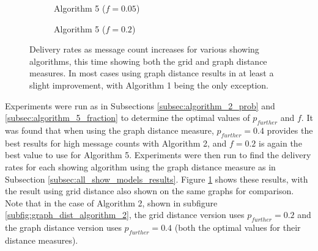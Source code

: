 \documentclass[bsc,frontabs,twoside,singlespacing,parskip,deptreport]{infthesis}     %
\begin{document}
\begin{figure}
\begin{subfigure}[]{0.47\textwidth}
\caption{Algorithm 5 ($f=0.05$)}
\end{subfigure}
%
\par\bigskip 
%
\begin{subfigure}[]{0.47\textwidth}
\caption{Algorithm 5 ($f=0.2$)}
\end{subfigure}
\caption{Delivery rates as message count increases for various showing algorithms, this time showing both the grid and graph distance measures. In most cases using graph distance results in at least a slight improvement, with Algorithm 1 being the only exception.}
\label{fig:graph_dist_show_models}
\end{figure}

Experiments were run as in Subsections \ref{subsec:algorithm_2_prob} and \ref{subsec:algorithm_5_fraction} to determine the optimal values of $p_{further}$ and $f$. It was found that when using the graph distance measure, $p_{further}=0.4$ provides the best results for high message counts with Algorithm 2, and $f=0.2$ is again the best value to use for Algorithm 5. Experiments were then run to find the delivery rates for each showing algorithm using the graph distance measure as in Subsection \ref{subsec:all_show_models_results}. Figure \ref{fig:graph_dist_show_models} shows these results, with the result using grid distance also shown on the same graphs for comparison. Note that in the case of Algorithm 2, shown in subfigure \ref{subfig:graph_dist_algorithm_2}, the grid distance version uses $p_{further}=0.2$ and the graph distance version uses $p_{further}=0.4$ (both the optimal values for their distance measures).
\end{document}
